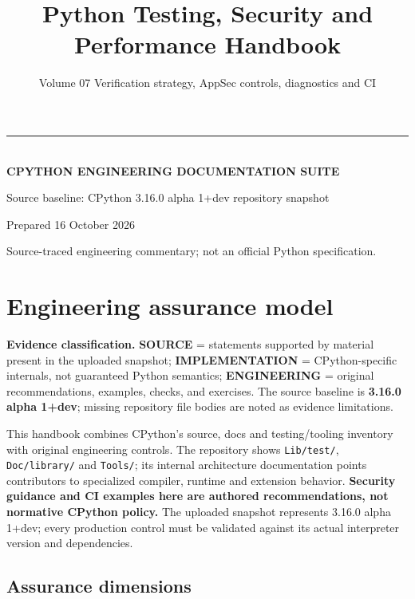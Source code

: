 \documentclass[
  11pt,
]{report}
\title{Python Testing, Security and Performance Handbook}
\subtitle{Volume 07 \textbar{} Verification strategy, AppSec controls,
diagnostics and CI}
\author{}
\date{}
\makeatletter
\newcommand{\passthrough}[1]{#1}
\renewcommand{\maketitle}{%
  \hypersetup{pageanchor=false}%
\begin{titlepage}\pagecolor{CPNavy}\color{white}\sffamily
  \vspace*{0.8in}
  {\color{CPGold}\rule{2.1in}{4pt}}\\[16pt]
  {\Large\bfseries CPYTHON ENGINEERING DOCUMENTATION SUITE}\\[24pt]
  {\Huge\bfseries \@title\par}\vspace{19pt}
  \vfill
  {\normalsize Source baseline: CPython 3.16.0 alpha 1+dev repository snapshot}\par
  {\normalsize Prepared 16 October 2026}\par
  {\small\color{white!70} Source-traced engineering commentary; not an official Python specification.}\vspace{0.65in}
  \end{titlepage}\hypersetup{pageanchor=true}\nopagecolor\color{black}
  }
\makeatother
\begin{document}
\maketitle

{
\setcounter{tocdepth}{1}
\tableofcontents
}
\chapter{Engineering assurance model}\label{engineering-assurance-model}

\begin{sourcebox}
\textbf{Evidence classification.} \textbf{SOURCE} = statements supported by material present in the uploaded snapshot; \textbf{IMPLEMENTATION} = CPython-specific internals, not guaranteed Python semantics; \textbf{ENGINEERING} = original recommendations, examples, checks, and exercises. The source baseline is \textbf{3.16.0 alpha 1+dev}; missing repository file bodies are noted as evidence limitations.
\end{sourcebox}

This handbook combines CPython's source, docs and testing/tooling
inventory with original engineering controls. The repository shows
\passthrough{\lstinline!Lib/test/!},
\passthrough{\lstinline!Doc/library/!} and
\passthrough{\lstinline!Tools/!}; its internal architecture
documentation points contributors to specialized compiler, runtime and
extension behavior. \textbf{Security guidance and CI examples here are
authored recommendations, not normative CPython policy.} The uploaded
snapshot represents 3.16.0 alpha 1+dev; every production control must be
validated against its actual interpreter version and dependencies.

\section{Assurance dimensions}\label{assurance-dimensions}
\end{document}
